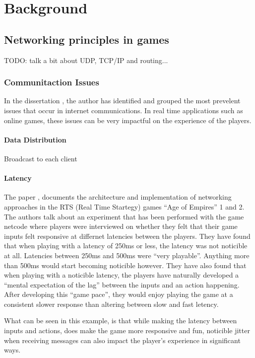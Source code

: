 \chapter{Background}

\section{Networking principles in games}
TODO: talk a bit about UDP, TCP/IP and routing...

\subsection{Communitaction Issues}
In the dissertation , the author has identified and grouped the most prevelent issues that occur in internet communications. In real time applications such as online games, these issues can be very impactful on the experience of the players.

\subsubsection{Data Distribution}
Broadcast to each client

\subsubsection{Latency}
The paper , documents the architecture and implementation of networking approaches in the RTS (Real Time Startegy) games ``Age of Empires'' 1 and 2. The authors talk about an experiment that has been performed with the game netcode where players were interviewed on whether they felt that their game inputs felt responsive at differnet latencies between the players. They have found that when playing with a latency of 250ms or less, the latency was not noticible at all. Latencies between 250ms and 500ms were ``very playable''. Anything more than 500ms would start becoming noticible however. They have also found that when playing with a noticible latency, the players have naturally developed a ``mental expectation of the lag'' between the inputs and an action happening. After developing this ``game pace'', they would enjoy playing the game at a consistent slower response than altering between slow and fast letency.

What can be seen in this example, is that while making the latency between inputs and actions, does make the game more responsive and fun, noticible jitter when receiving messages can also impact the player's experience in significant ways.


